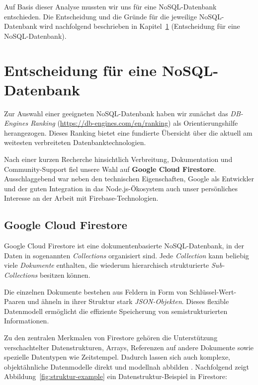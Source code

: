 \documentclass[12pt,a4paper%
              ,oneside     %
              ,titlepage
              ,DIV=13
              ,headinclude
              ,footinclude=false%
              ,cleardoublepage=empty%
              ,parskip=half,
              BCOR=0mm,
              ]{scrreprt}
\begin{document}
Auf Basis dieser Analyse mussten wir uns für eine NoSQL-Datenbank entschieden. Die Entscheidung und die Gründe für die jeweilige NoSQL-Datenbank wird nachfolgend beschrieben in Kapitel~\ref{entscheidung-chapter} (\glqq Entscheidung für eine NoSQL-Datenbank\grqq{}).

\chapter{Entscheidung für eine NoSQL-Datenbank}
\label{entscheidung-chapter}

Zur Auswahl einer geeigneten NoSQL-Datenbank haben wir zunächst das \textit{DB-Engines Ranking} (\url{https://db-engines.com/en/ranking}) als Orientierungshilfe herangezogen. Dieses Ranking bietet eine fundierte Übersicht über die aktuell am weitesten verbreiteten Datenbanktechnologien.

Nach einer kurzen Recherche hinsichtlich Verbreitung, Dokumentation und Community-Support fiel unsere Wahl auf \textbf{Google Cloud Firestore}. Ausschlaggebend war neben den technischen Eigenschaften, Google als Entwickler und der guten Integration in das Node.js-Ökosystem auch unser persönliches Interesse an der Arbeit mit Firebase-Technologien.

\section{Google Cloud Firestore}

Google Cloud Firestore ist eine dokumentenbasierte NoSQL-Datenbank, in der Daten in sogenannten \textit{Collections} organisiert sind. Jede \textit{Collection} kann beliebig viele \textit{Dokumente} enthalten, die wiederum hierarchisch strukturierte \textit{Sub-Collections} besitzen können. 

Die einzelnen Dokumente bestehen aus Feldern in Form von Schlüssel-Wert-Paaren und ähneln in ihrer Struktur stark \textit{JSON-Objekten}. Dieses flexible Datenmodell ermöglicht die effiziente Speicherung von semistrukturierten Informationen.

Zu den zentralen Merkmalen von Firestore gehören die Unterstützung verschachtelter Datenstrukturen, Arrays, Referenzen auf andere Dokumente sowie spezielle Datentypen wie Zeitstempel. Dadurch lassen sich auch komplexe, objektähnliche Datenmodelle direkt und modellnah abbilden \cite{Kesavan.2023, Firebase.2025, FirebaseDatenmodell.2025}. Nachfolgend zeigt Abbildung~\ref{fig:struktur-example} ein Datenstruktur-Beispiel in Firestore:
\end{document}
